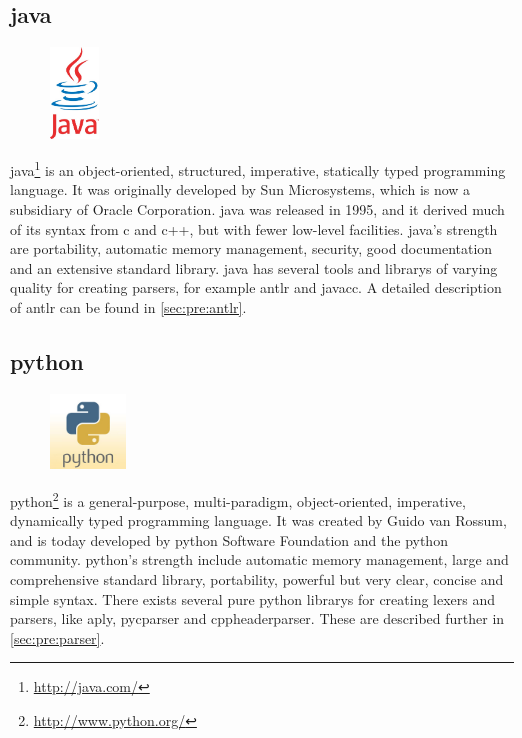 \subsection{\Gls{java}}
\label{sec:pre:java}
\begin{figure}
	\vspace{-30pt}
	\includegraphics[width=1.3cm]{./planning/img/java_logo}
	\vspace{-30pt}
\end{figure}
\Gls{java}\footnote{\url{http://java.com/}} is an object-oriented, structured,
imperative, statically typed programming language. It was originally developed
by Sun Microsystems, which is now a subsidiary of Oracle Corporation. \Gls{java} was
released in 1995, and it derived much of its syntax from \Gls{c} and \Gls{c++}, but with
fewer low-level facilities. \Gls{java}’s strength are portability, automatic memory
management, security, good documentation and an extensive standard \gls{library}.
\Gls{java} has several tools and \glspl{library} of varying quality for creating \glspl{parser},
for example \Gls{antlr} and \Gls{javacc}. A detailed description of \Gls{antlr} can be found in 
\autoref{sec:pre:antlr}.

\subsection{python}
\label{sec:pre:python}
\begin{figure}
	\vspace{-20pt}
	\includegraphics[width=2cm]{./planning/img/python_logo}
	\vspace{-20pt}
\end{figure}
\Gls{python}\footnote{\url{http://www.python.org/}} is a general-purpose,
multi-paradigm, object-oriented, imperative, dynamically typed programming
language. It was created by Guido van Rossum, and is today developed by \Gls{python}
Software Foundation and the \Gls{python} community. \Gls{python}’s strength include
automatic memory management, large and comprehensive standard \gls{library},
portability, powerful but very clear, concise and simple syntax. There exists
several pure \Gls{python} \glspl{library} for creating \glspl{lexer} and \glspl{parser}, like \Gls{aply},
\gls{pycparser} and cppheaderparser. These are described further in
\autoref{sec:pre:parser}.


